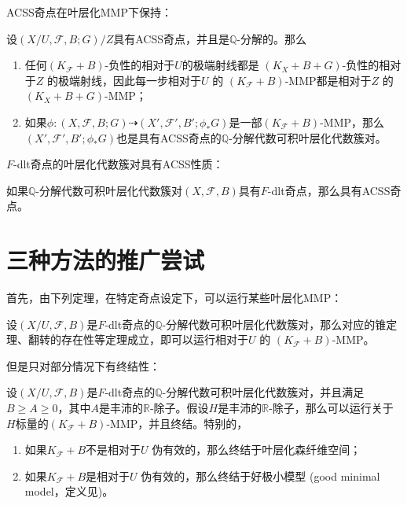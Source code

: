 ACSS奇点在叶层化MMP下保持：
\begin{proposition}\cite[Lemma 4.8]{acc_foliation}\label{acssmmp}
 设$(X/U,\mathcal{F},B;G)/Z$具有ACSS奇点，并且是$\mathbb{Q}$-分解的。那么 
 \begin{enumerate}
   \item 任何$(K_{\mathcal{F}}+B)$-负性的相对于$U$的极端射线都是 $(K_{X}+B+G)$-负性的相对于$Z$ 的极端射线，因此每一步相对于$U$ 的 $(K_{\mathcal{F}}+B)$-MMP都是相对于$Z$ 的$(K_{X}+B+G)$-MMP；
   \item 如果$\phi:(X,\mathcal{F},B;G) \dashrightarrow (X',\mathcal{F}',B';\phi_{*}G)$是一部$(K_{\mathcal{F}}+B)$-MMP，那么$(X',\mathcal{F}',B';\phi_{*}G)$也是具有ACSS奇点的$\mathbb{Q}$-分解代数可积叶层化代数簇对。
 \end{enumerate}
\end{proposition}
$F$-dlt奇点的叶层化代数簇对具有ACSS性质：
\begin{theorem}\cite[Theorem 17.0.1]{chlx}
 如果$\mathbb{Q}$-分解代数可积叶层化代数簇对$(X,\mathcal{F},B)$具有$F$-dlt奇点，那么具有ACSS奇点。  
\end{theorem}

\section{三种方法的推广尝试}
首先，由下列定理，在特定奇点设定下，可以运行某些叶层化MMP：
\begin{theorem}[叶层化MMP]\cite[Theorem 2.1.1]{chlx}
设$(X/U,\mathcal{F},B)$是$F$-dlt奇点的$\mathbb{Q}$-分解代数可积叶层化代数簇对，那么对应的锥定理、翻转的存在性等定理成立，即可以运行相对于$U$ 的 $(K_{\mathcal{F}}+B)$-MMP。  
\end{theorem}
但是只对部分情况下有终结性：
\begin{theorem}[叶层化MMP终结性]\cite[Theorem 2.1.2]{chlx}
设$(X/U,\mathcal{F},B)$是$F$-dlt奇点的$\mathbb{Q}$-分解代数可积叶层化代数簇对，并且满足$B\geqslant A \geqslant 0$，其中$A$是丰沛的$\mathbb{R}$-除子。假设$H$是丰沛的$\mathbb{R}$-除子，那么可以运行关于$H$标量的$(K_{\mathcal{F}}+B)$-MMP，并且终结。特别的，
\begin{enumerate}
  \item 如果$K_{\mathcal{F}}+B$不是相对于$U$ 伪有效的，那么终结于叶层化森纤维空间；
  \item 如果$K_{\mathcal{F}}+B$是相对于$U$ 伪有效的，那么终结于好极小模型 (good minimal model，定义见\cite[Definition 9.1.1]{chlx})。
\end{enumerate}
\end{theorem}

